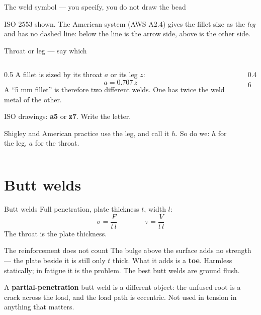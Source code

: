 \documentclass[aspectratio=169,10pt]{beamer}
\begin{document}
\begin{frame}{The weld symbol --- you specify, you do not draw the bead}
\centering
\resizebox{0.88\textwidth}{!}{}

\vfill\footnotesize\raggedright
ISO 2553 shown. The American system (AWS A2.4) gives the fillet size as the \emph{leg} and has no
dashed line: below the line is the arrow side, above is the other side.
\end{frame}

\begin{frame}{Throat or leg --- say which}
\begin{columns}[c]
\begin{column}{0.5\textwidth}
A fillet is sized by its throat $a$ or its leg $z$:
\[ a = 0.707\,z \]
A ``5 mm fillet'' is therefore \alert{two different welds}. One has twice the weld metal of the other.

\medskip
ISO drawings: \textbf{a5} or \textbf{z7}. Write the letter.

\medskip
Shigley and American practice use the leg, and call it $h$. So do we: $h$ for the leg, $a$ for the throat.
\end{column}
\begin{column}{0.46\textwidth}
\centering
{}
\end{column}
\end{columns}
\end{frame}

\section{Butt welds}

\begin{frame}{Butt welds}
Full penetration, plate thickness $t$, width $l$:
\[ \sigma=\frac{F}{t\,l}\qquad\qquad \tau=\frac{V}{t\,l} \]
The throat is the plate thickness.

\vfill
\begin{alertblock}{The reinforcement does not count}
The bulge above the surface adds no strength --- the plate beside it is still only $t$ thick. What
it adds is a \textbf{toe}. Harmless statically; in fatigue it is the problem. The best butt welds
are ground flush.
\end{alertblock}

\vfill
A \textbf{partial-penetration} butt weld is a different object: the unfused root is a crack across
the load, and the load path is eccentric. Not used in tension in anything that matters.
\end{frame}
\end{document}
